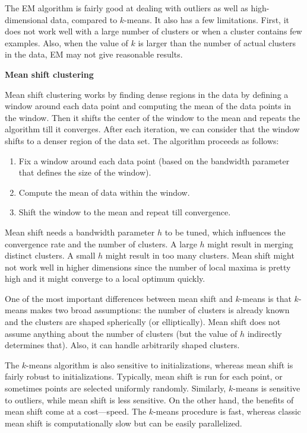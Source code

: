\documentclass[]{krantz}
\begin{document}
The EM algorithm is fairly good at dealing with outliers as well as
high-dimensional data, compared to \(k\)-means. It also has a few
limitations. First, it does not work well with a large number of
clusters or when a cluster contains few examples. Also, when the value
of \(k\) is larger than the number of actual clusters in the data, EM
may not give reasonable results.

\textbf{Mean shift clustering}

Mean shift clustering works by finding dense regions in the data by
defining a window around each data point and computing the mean of the
data points in the window. Then it shifts the center of the window to
the mean and repeats the algorithm till it converges. After each
iteration, we can consider that the window shifts to a denser region of
the data set. The algorithm proceeds as follows:

\begin{enumerate}
\def\labelenumi{\arabic{enumi}.}
\item
  Fix a window around each data point (based on the bandwidth parameter
  that defines the size of the window).
\item
  Compute the mean of data within the window.
\item
  Shift the window to the mean and repeat till convergence.
\end{enumerate}

Mean shift needs a bandwidth parameter \(h\) to be tuned, which
influences the convergence rate and the number of clusters. A large
\(h\) might result in merging distinct clusters. A small \(h\) might
result in too many clusters. Mean shift might not work well in higher
dimensions since the number of local maxima is pretty high and it might
converge to a local optimum quickly.

One of the most important differences between mean shift and \(k\)-means
is that \(k\)-means makes two broad assumptions: the number of clusters
is already known and the clusters are shaped spherically (or
elliptically). Mean shift does not assume anything about the number of
clusters (but the value of \(h\) indirectly determines that). Also, it
can handle arbitrarily shaped clusters.

The \(k\)-means algorithm is also sensitive to initializations, whereas
mean shift is fairly robust to initializations. Typically, mean shift is
run for each point, or sometimes points are selected uniformly randomly.
Similarly, \(k\)-means is sensitive to outliers, while mean shift is
less sensitive. On the other hand, the benefits of mean shift come at a
cost---speed. The \(k\)-means procedure is fast, whereas classic mean
shift is computationally slow but can be easily parallelized.
\end{document}

